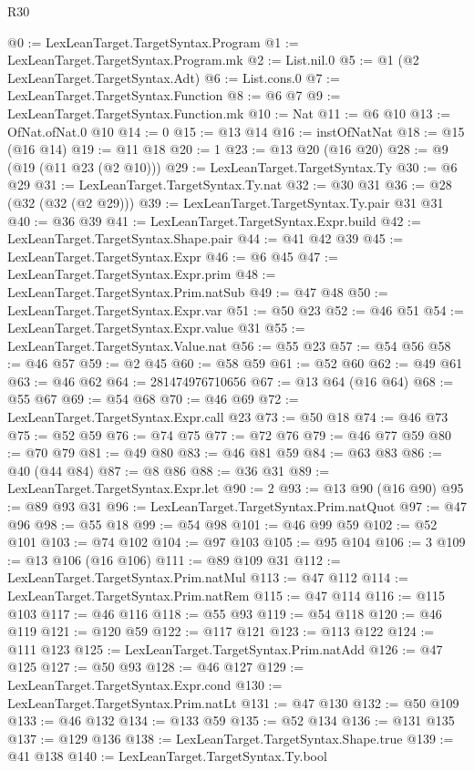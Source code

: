 \begin{lexlean}{R30}
\begin{coremodule}
@0 := LexLeanTarget.TargetSyntax.Program
@1 := LexLeanTarget.TargetSyntax.Program.mk
@2 := List.nil.{0}
@5 := @1 (@2 LexLeanTarget.TargetSyntax.Adt)
@6 := List.cons.{0}
@7 := LexLeanTarget.TargetSyntax.Function
@8 := @6 @7
@9 := LexLeanTarget.TargetSyntax.Function.mk
@10 := Nat
@11 := @6 @10
@13 := OfNat.ofNat.{0} @10
@14 := 0
@15 := @13 @14
@16 := instOfNatNat
@18 := @15 (@16 @14)
@19 := @11 @18
@20 := 1
@23 := @13 @20 (@16 @20)
@28 := @9 (@19 (@11 @23 (@2 @10)))
@29 := LexLeanTarget.TargetSyntax.Ty
@30 := @6 @29
@31 := LexLeanTarget.TargetSyntax.Ty.nat
@32 := @30 @31
@36 := @28 (@32 (@32 (@2 @29)))
@39 := LexLeanTarget.TargetSyntax.Ty.pair @31 @31
@40 := @36 @39
@41 := LexLeanTarget.TargetSyntax.Expr.build
@42 := LexLeanTarget.TargetSyntax.Shape.pair
@44 := @41 @42 @39
@45 := LexLeanTarget.TargetSyntax.Expr
@46 := @6 @45
@47 := LexLeanTarget.TargetSyntax.Expr.prim
@48 := LexLeanTarget.TargetSyntax.Prim.natSub
@49 := @47 @48
@50 := LexLeanTarget.TargetSyntax.Expr.var
@51 := @50 @23
@52 := @46 @51
@54 := LexLeanTarget.TargetSyntax.Expr.value @31
@55 := LexLeanTarget.TargetSyntax.Value.nat
@56 := @55 @23
@57 := @54 @56
@58 := @46 @57
@59 := @2 @45
@60 := @58 @59
@61 := @52 @60
@62 := @49 @61
@63 := @46 @62
@64 := 281474976710656
@67 := @13 @64 (@16 @64)
@68 := @55 @67
@69 := @54 @68
@70 := @46 @69
@72 := LexLeanTarget.TargetSyntax.Expr.call @23
@73 := @50 @18
@74 := @46 @73
@75 := @52 @59
@76 := @74 @75
@77 := @72 @76
@79 := @46 @77 @59
@80 := @70 @79
@81 := @49 @80
@83 := @46 @81 @59
@84 := @63 @83
@86 := @40 (@44 @84)
@87 := @8 @86
@88 := @36 @31
@89 := LexLeanTarget.TargetSyntax.Expr.let
@90 := 2
@93 := @13 @90 (@16 @90)
@95 := @89 @93 @31
@96 := LexLeanTarget.TargetSyntax.Prim.natQuot
@97 := @47 @96
@98 := @55 @18
@99 := @54 @98
@101 := @46 @99 @59
@102 := @52 @101
@103 := @74 @102
@104 := @97 @103
@105 := @95 @104
@106 := 3
@109 := @13 @106 (@16 @106)
@111 := @89 @109 @31
@112 := LexLeanTarget.TargetSyntax.Prim.natMul
@113 := @47 @112
@114 := LexLeanTarget.TargetSyntax.Prim.natRem
@115 := @47 @114
@116 := @115 @103
@117 := @46 @116
@118 := @55 @93
@119 := @54 @118
@120 := @46 @119
@121 := @120 @59
@122 := @117 @121
@123 := @113 @122
@124 := @111 @123
@125 := LexLeanTarget.TargetSyntax.Prim.natAdd
@126 := @47 @125
@127 := @50 @93
@128 := @46 @127
@129 := LexLeanTarget.TargetSyntax.Expr.cond
@130 := LexLeanTarget.TargetSyntax.Prim.natLt
@131 := @47 @130
@132 := @50 @109
@133 := @46 @132
@134 := @133 @59
@135 := @52 @134
@136 := @131 @135
@137 := @129 @136
@138 := LexLeanTarget.TargetSyntax.Shape.true
@139 := @41 @138
@140 := LexLeanTarget.TargetSyntax.Ty.bool

\end{coremodule}
\end{lexlean}
